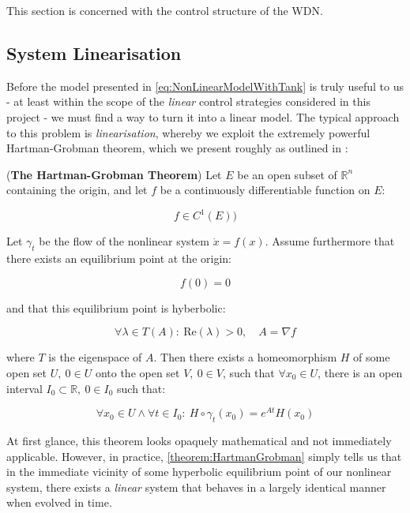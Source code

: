 This section is concerned with the control structure of the WDN.

\subsection{System Linearisation}\label{subsec:Linearisation}

Before the model presented in \cref{eq:NonLinearModelWithTank} is truly useful to us - at least within the scope of the \textit{linear} control strategies considered in this project - we must find a way to turn it into a linear model. The typical approach to this problem is \textit{linearisation}, whereby we exploit the extremely powerful Hartman-Grobman theorem, which we present roughly as outlined in \cite{Perko2001}:


\begin{theorem}\label{theorem:HartmanGrobman}
(\textbf{The Hartman-Grobman Theorem}) Let $E$ be an open subset of $\mathbb{R}^n$ containing the origin, and let $f$ be a continuously differentiable function on $E$:
 
\begin{equation*}
f \in C^1(E))
\end{equation*}

Let $\gamma_t$ be the flow of the nonlinear system $\dot{x} = f(x)$. Assume furthermore that there exists an equilibrium point at the origin: 

\begin{equation*}
f(0) = 0
\end{equation*}

and that this equilibrium point is hyberbolic: 

\begin{equation*}
\forall \lambda \in T(A): \ \text{Re}(\lambda) > 0, \quad A = \nabla f  
\end{equation*}

where $T$ is the eigenspace of $A$. Then there exists a homeomorphism $H$ of some open set $U, \ 0 \in U$ onto the open set $V, \ 0 \in V$, such that $\forall x_0 \in U$, there is an open interval $I_0 \subset \mathbb{R}, \ 0 \in I_0$ such that:

\begin{equation*}
	\forall x_0 \in U \wedge \forall t \in I_0: \ H \circ \gamma_t(x_0) = e^{At}H(x_0)
\end{equation*}
\end{theorem}

At first glance, this theorem looks opaquely mathematical and not immediately applicable. However, in practice, \cref{theorem:HartmanGrobman} simply tells us that in the immediate vicinity of some hyperbolic equilibrium point of our nonlinear system, there exists a \textit{linear} system that behaves in a largely identical manner when evolved in time.

